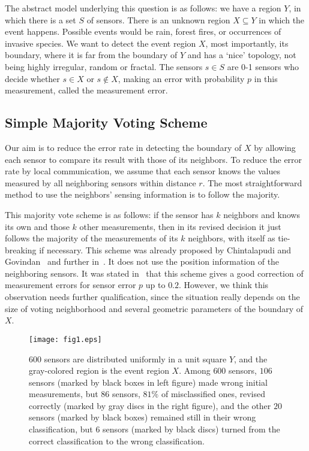 \documentclass{article}
\begin{document}
\par
The abstract model underlying this question is as follows: we have a
region $Y$, in which there is a set $S$ of sensors. There is an unknown
region $X \subseteq Y$ in which the event happens. Possible events would
be rain, forest fires, or occurrences of invasive species. We want to detect the event region $X$, most importantly, its boundary, where it is far from the boundary of $Y$ and has a `nice' topology, not being highly irregular, random or fractal. The sensors $s\in S$ are 0-1 sensors who decide whether $s\in X$ or $s\notin X$, making an error with probability $p$ in this measurement, called the measurement error.

\subsection{Simple Majority Voting Scheme}
Our aim is to reduce the error rate in detecting the boundary of $X$
by allowing each sensor to compare its result with those of its neighbors. To reduce the error rate by local communication, we assume that each sensor knows the values measured by all neighboring sensors within distance $r$. The most
straightforward method to use the neighbors' sensing information is
to follow the majority.

This majority vote scheme is as follows: if the sensor has $k$ neighbors and knows its own and those $k$ other measurements, then in its revised decision it just follows the majority of the measurements of its $k$ neighbors, with itself as tie-breaking if necessary.
This scheme was already proposed by Chintalapudi and Govindan~\cite{CG03}
and further in~\cite{KI04}. It does not use the position information of
the neighboring sensors. It was stated in~\cite{KI04} that this scheme
gives a good correction of measurement errors for sensor error $p$ up
to $0.2$. However, we think this observation needs further qualification,
since the situation really depends on the size of voting neighborhood
and several geometric parameters of the boundary of $X$.

\begin{figure}
\centering
\texttt{[image: fig1.eps]}
\caption{$600$ sensors are distributed uniformly in a unit square $Y$, and the gray-colored region is the event region $X$. Among $600$ sensors, $106$ sensors (marked by black boxes in left figure) made wrong initial measurements, but $86$ sensors, $81\%$ of misclassified ones, revised correctly (marked by gray discs in the right figure), and the other $20$ sensors (marked by black boxes) remained still in their wrong classification, but $6$ sensors (marked by black discs) turned from the correct classification to the wrong classification.}
\label{fig:intro}
\end{figure}
\end{document}
